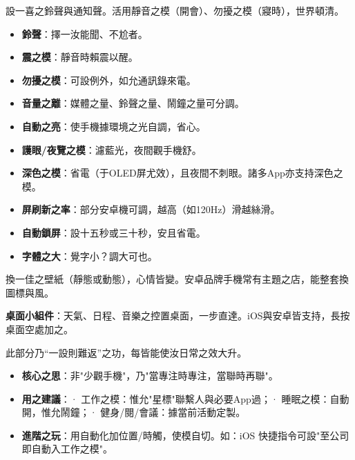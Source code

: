 


設一喜之鈴聲與通知聲。活用靜音之模（開會）、勿擾之模（寢時），世界頓清。

\begin{itemize}
  \item \textbf{鈴聲}：擇一汝能聞、不尬者。
  \item \textbf{震之模}：靜音時賴震以醒。
  \item \textbf{勿擾之模}：可設例外，如允通訊錄來電。
  \item \textbf{音量之離}：媒體之量、鈴聲之量、鬧鐘之量可分調。
\end{itemize}


\begin{itemize}
  \item \textbf{自動之亮}：使手機據環境之光自調，省心。
  \item \textbf{護眼/夜覽之模}：濾藍光，夜間觀手機舒。
  \item \textbf{深色之模}：省電（于OLED屏尤效），且夜間不刺眼。諸多App亦支持深色之模。
  \item \textbf{屏刷新之率}：部分安卓機可調，越高（如120Hz）滑越絲滑。
  \item \textbf{自動鎖屏}：設十五秒或三十秒，安且省電。
  \item \textbf{字體之大}：覺字小？調大可也。
\end{itemize}


換一佳之壁紙（靜態或動態），心情皆變。安卓品牌手機常有主題之店，能整套換圖標與風。

\textbf{桌面小組件}：天氣、日程、音樂之控置桌面，一步直達。iOS與安卓皆支持，長按桌面空處加之。


此部分乃“一設則難返”之功，每皆能使汝日常之效大升。


\begin{itemize}
  \item \textbf{核心之思}：非"少觀手機"，乃"當專注時專注，當聯時再聯"。
  \item \textbf{用之建議}：\newline · 工作之模：惟允"星標"聯繫人與必要App過；\newline · 睡眠之模：自動開，惟允鬧鐘；\newline · 健身/閱/會議：據當前活動定製。
  \item \textbf{進階之玩}：用自動化加位置/時觸，使模自切。如：iOS 快捷指令可設"至公司即自動入工作之模"。
\end{itemize}

